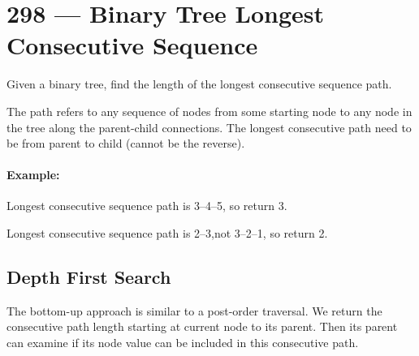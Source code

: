 \section{298 --- Binary Tree Longest Consecutive Sequence}
Given a binary tree, find the length of the longest consecutive sequence path.
\par
The path refers to any sequence of nodes from some starting node to any node in the tree along the parent-child connections. The longest consecutive path need to be from parent to child (cannot be the reverse).

\paragraph{Example:}

\begin{flushleft}

\begin{figure}[H]
\end{figure}

Longest consecutive sequence path is 3--4--5, so return 3.

\begin{figure}[H]
\end{figure}

Longest consecutive sequence path is 2--3,not 3--2--1, so return 2.
\end{flushleft}
\subsection{Depth First Search}
The bottom-up approach is similar to a post-order traversal. We return the consecutive path length starting at current node to its parent. Then its parent can examine if its node value can be included in this consecutive path.

